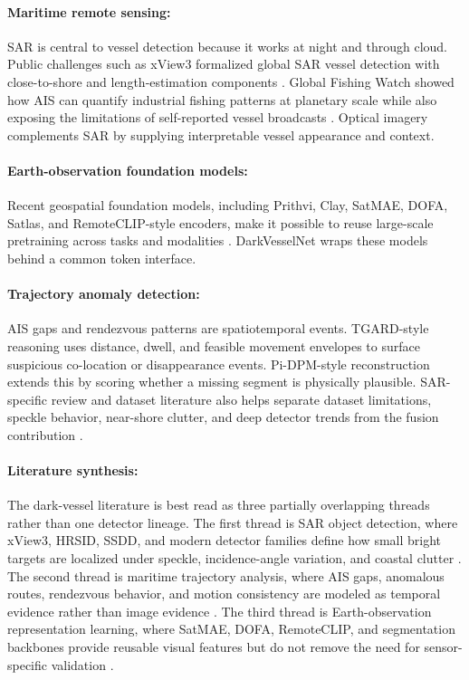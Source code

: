 \documentclass{article}
\begin{document}
\paragraph{Maritime remote sensing:}
SAR is central to vessel detection because it works at night and through cloud. Public challenges such as xView3 formalized global SAR vessel detection with close-to-shore and length-estimation components \citep{paolo2022xview3}. Global Fishing Watch showed how AIS can quantify industrial fishing patterns at planetary scale while also exposing the limitations of self-reported vessel broadcasts \citep{kroodsma2018tracking}. Optical imagery complements SAR by supplying interpretable vessel appearance and context.

\paragraph{Earth-observation foundation models:}
Recent geospatial foundation models, including Prithvi, Clay, SatMAE, DOFA, Satlas, and RemoteCLIP-style encoders, make it possible to reuse large-scale pretraining across tasks and modalities \citep{cong2022satmae,xiong2024dofa,liu2024remoteclip}. DarkVesselNet wraps these models behind a common token interface.

\paragraph{Trajectory anomaly detection:}
AIS gaps and rendezvous patterns are spatiotemporal events. TGARD-style reasoning uses distance, dwell, and feasible movement envelopes to surface suspicious co-location or disappearance events. Pi-DPM-style reconstruction extends this by scoring whether a missing segment is physically plausible. SAR-specific review and dataset literature also helps separate dataset limitations, speckle behavior, near-shore clutter, and deep detector trends from the fusion contribution \citep{zhang2022sarshipreview,li2017ssdd,wang2019sarship}.



\paragraph{Literature synthesis:}
The dark-vessel literature is best read as three partially overlapping threads rather than one detector lineage. The first thread is SAR object detection, where xView3, HRSID, SSDD, and modern detector families define how small bright targets are localized under speckle, incidence-angle variation, and coastal clutter \citep{paolo2022xview3,wei2020hrsid,li2017ssdd,wang2019sarship,carion2020detr,zhu2021deformabledetr}. The second thread is maritime trajectory analysis, where AIS gaps, anomalous routes, rendezvous behavior, and motion consistency are modeled as temporal evidence rather than image evidence \citep{pallotta2013vessel,nguyen2020geotracknet,sharma2022tist,ristic2008maritime}. The third thread is Earth-observation representation learning, where SatMAE, DOFA, RemoteCLIP, and segmentation backbones provide reusable visual features but do not remove the need for sensor-specific validation \citep{cong2022satmae,xiong2024dofa,liu2024remoteclip,ronneberger2015unet,cheng2022mask2former}.
\end{document}
